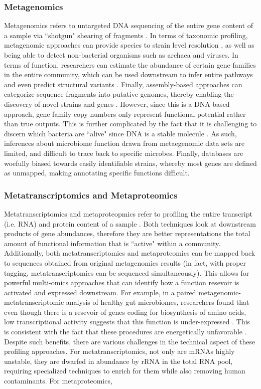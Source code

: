 \subsubsection{Metagenomics}
Metagenomics refers to untargeted DNA sequencing of the entire gene content of a sample via ``shotgun" shearing of fragments \cite{quince2017shotgun}. In terms of taxonomic profiling, metagenomic approaches can provide species to strain level resolution \cite{truong2015metaphlan2}, as well as being able to detect non-bacterial organisms such as archaea and viruses. In terms of function, researchers can estimate the abundance of certain gene families in the entire community, which can be used downstream to infer entire pathways and even predict structural variants \cite{kiefl2022structureinformed}. Finally, assembly-based approaches can categorize sequence fragments into putative genomes, thereby enabling the discovery of novel strains and genes \cite{perez-cobas2020metagenomic}. However, since this is a DNA-based approach, gene family copy numbers only represent functional potential rather than true outputs. This is further complicated by the fact that it is challenging to discern which bacteria are ``alive" since DNA is a stable molecule \cite{quince2017shotgun}. As such, inferences about microbiome function drawn from metaegenomic data sets are limited, and difficult to trace back to specific microbes. Finally, databases are woefully biased towards easily identifiable strains, whereby most genes are defined as unmapped, making annotating specific functions difficult. 

\subsubsection{Metatranscriptomics and Metaproteomics}
Metatranscriptomics and metaproteopmics refer to profiling the entire transcript (i.e. RNA) and protein content of a sample \cite{franzosa2015sequencing}. Both techniques look at downstream products of gene abundances, therefore they are better representations the total amount of functional information that is ``active" within a community. Additionally, both metatranscriptomics and metaproteomics can be mapped back to sequences obtained from original metagenomics results (in fact, with proper tagging, metatranscriptomics can be sequenced simultaneously). This allows for powerful multi-omics approaches that can identify how a function resevoir is activated and expressed downstream. For example, in a paired metagenomic-metatranscriptomic analysis of healthy gut microbiomes, researchers found that even though there is a resevoir of genes coding for biosynthesis of amino acids, low transcriptional activity suggests that this function is under-expressed \cite{franzosa2014relating}. This is consistent with the fact that these procedures are energetically unfavorable \cite{oliphant2019macronutrient}. Despite such benefits, there are various challenges in the technical aspect of these profiling approaches. For metatranscriptomics, not only are mRNAs highly unstable, they are dwarfed in abundance by rRNA in the total RNA pool, requiring specialized techniques to enrich for them while also removing human contaminants. For metaproteomics, 

